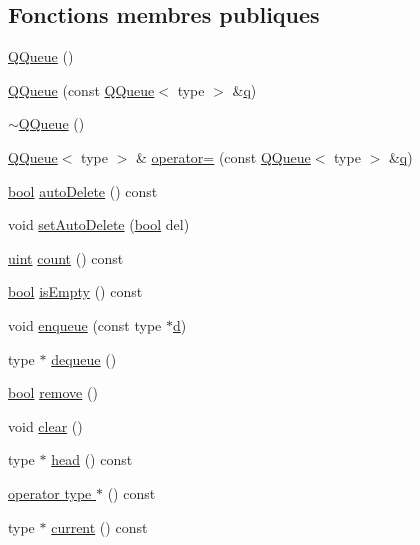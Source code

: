 \subsection*{Fonctions membres publiques}
\begin{DoxyCompactItemize}
\item 
\hyperlink{class_q_queue_a60eeb6b62031648fbc091e6d84c08b4d}{Q\+Queue} ()
\item 
\hyperlink{class_q_queue_aab79e1e35254c162e46d07c41f7e1385}{Q\+Queue} (const \hyperlink{class_q_queue}{Q\+Queue}$<$ type $>$ \&\hyperlink{060__command__switch_8tcl_ab678a0a9a7e94bce5b17141f40220d88}{q})
\item 
\hyperlink{class_q_queue_a226eee47e47a73fe18c223a787795468}{$\sim$\+Q\+Queue} ()
\item 
\hyperlink{class_q_queue}{Q\+Queue}$<$ type $>$ \& \hyperlink{class_q_queue_ab99ae42c4827b7b95028794a94c0cbb4}{operator=} (const \hyperlink{class_q_queue}{Q\+Queue}$<$ type $>$ \&\hyperlink{060__command__switch_8tcl_ab678a0a9a7e94bce5b17141f40220d88}{q})
\item 
\hyperlink{qglobal_8h_a1062901a7428fdd9c7f180f5e01ea056}{bool} \hyperlink{class_q_queue_a87ace6e57bf2474d5078b0150965605f}{auto\+Delete} () const 
\item 
void \hyperlink{class_q_queue_aa376db4c36968c2718aaf0e4d380515a}{set\+Auto\+Delete} (\hyperlink{qglobal_8h_a1062901a7428fdd9c7f180f5e01ea056}{bool} del)
\item 
\hyperlink{qglobal_8h_a4d3943ddea65db7163a58e6c7e8df95a}{uint} \hyperlink{class_q_queue_a1928033c2298403b8d9067b379ea49cc}{count} () const 
\item 
\hyperlink{qglobal_8h_a1062901a7428fdd9c7f180f5e01ea056}{bool} \hyperlink{class_q_queue_aa1358dff2b42b3b97a985f6ea2b6fc40}{is\+Empty} () const 
\item 
void \hyperlink{class_q_queue_a23eabd2eb37ec3e2c82f6303e030f24f}{enqueue} (const type $\ast$\hyperlink{060__command__switch_8tcl_af43f4b1f0064a33b2d662af9f06d3a00}{d})
\item 
type $\ast$ \hyperlink{class_q_queue_aed04c9f7a9e7f0b9657e41c8e7cadaf4}{dequeue} ()
\item 
\hyperlink{qglobal_8h_a1062901a7428fdd9c7f180f5e01ea056}{bool} \hyperlink{class_q_queue_aff4e8f7ace255c44b706f056c01e7845}{remove} ()
\item 
void \hyperlink{class_q_queue_a39841ee54f380f58fb96be30eb5e7c89}{clear} ()
\item 
type $\ast$ \hyperlink{class_q_queue_a5f6f5127b10e6521302d39b0762a60e7}{head} () const 
\item 
\hyperlink{class_q_queue_a0397e8a675837c27523ff65c7273f979}{operator type $\ast$} () const 
\item 
type $\ast$ \hyperlink{class_q_queue_a95c85fbf871a4d4ebd2338c36b6026c3}{current} () const 
\end{DoxyCompactItemize}


